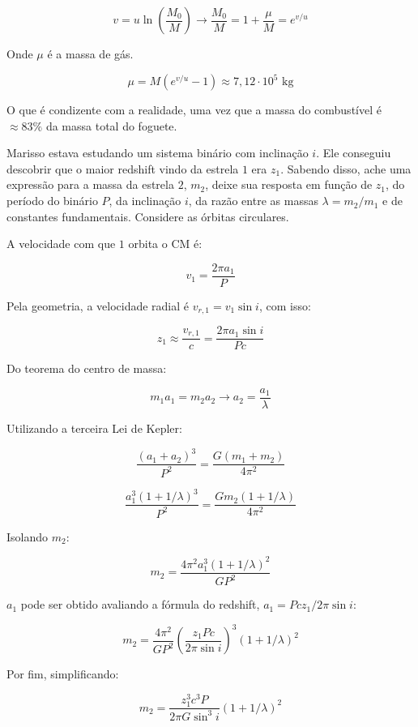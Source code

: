 \documentclass[11pt]{article}
\begin{document}
\begin{pproblem}
\begin{pssolution*}{}{}
\begin{alternativas}
            \[v = u\ln\left(\frac{M_0}{M}\right) \rightarrow \frac{M_0}{M}  = 1+ \frac{\mu}{M}= e^{v/u}\]

            Onde \(\mu\) é a massa de gás.

            \[\boxed{\mu = M(e^{v/u}-1) \approx 7,12 \cdot 10^5 \text{ kg}}\]

            O que é condizente com a realidade, uma vez que a massa do combustível é \(\approx 83\%\) da massa total do foguete.
        \end{alternativas}
    \end{pssolution*}
\end{pproblem}

\begin{pproblem} Marisso estava estudando um sistema binário com inclinação \(i\). Ele conseguiu descobrir que o maior redshift vindo da estrela \(1\) era \(z_1\). Sabendo disso, ache uma expressão para a massa da estrela \(2\), \(m_2\), deixe sua resposta em função de \(z_1\), do período do binário \(P\), da inclinação \(i\), da razão entre as massas \(\lambda  = m_2/m_1\) e de constantes fundamentais. Considere as órbitas circulares.
    \begin{pssolution*}{}{}
        A velocidade com que \(1\) orbita o CM é:

        \[v_1 = \frac{2\pi a_1}{P}\]

        Pela geometria, a velocidade radial é \(v_{r,1}=v_1\sin i\), com isso:

        \[z_1 \approx \frac{v_{r,1}}{c} = \frac{2\pi a_1\sin i}{Pc}\]

        Do teorema do centro de massa:

        \[m_1a_1=m_2a_2 \rightarrow a_2 = \frac{a_1}{\lambda}\]

        Utilizando a terceira Lei de Kepler:

        \[\frac{(a_1+a_2)^3}{P^2} = \frac{G(m_1+m_2)}{4\pi^2}\]

        \[\frac{a_1^3(1+1/\lambda)^3}{P^2} = \frac{Gm_2(1+1/\lambda)}{4\pi^2}\]

        Isolando \(m_2\):

        \[m_2 = \frac{4\pi^2a_1^3(1+1/\lambda)^2}{GP^2}\]

        \(a_1\) pode ser obtido avaliando a fórmula do redshift, \(a_1 = Pcz_1/2\pi\sin i\):

        \[m_2 = \frac{4\pi^2}{GP^2}\left(\frac{z_1Pc}{2\pi\sin i}\right)^3(1+1/\lambda)^2\]

        Por fim, simplificando:

        \[\boxed{m_2 = \frac{z_1^3c^3P}{2\pi G \sin^3i}(1+1/\lambda)^2}\]
    \end{pssolution*}
\end{pproblem}
\end{document}
